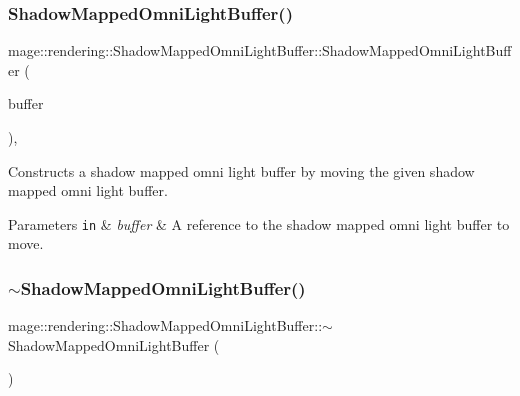 \subsubsection{\texorpdfstring{Shadow\+Mapped\+Omni\+Light\+Buffer()}{ShadowMappedOmniLightBuffer()}\hspace{0.1cm}{\footnotesize\ttfamily [3/3]}}
{\footnotesize\ttfamily mage\+::rendering\+::\+Shadow\+Mapped\+Omni\+Light\+Buffer\+::\+Shadow\+Mapped\+Omni\+Light\+Buffer (\begin{DoxyParamCaption}\item[{\mbox{\hyperlink{structmage_1_1rendering_1_1_shadow_mapped_omni_light_buffer}{Shadow\+Mapped\+Omni\+Light\+Buffer}} \&\&}]{buffer }\end{DoxyParamCaption})\hspace{0.3cm}{\ttfamily [default]}, {\ttfamily [noexcept]}}

Constructs a shadow mapped omni light buffer by moving the given shadow mapped omni light buffer.


\begin{DoxyParams}[1]{Parameters}
\mbox{\tt in}  & {\em buffer} & A reference to the shadow mapped omni light buffer to move. \\
\hline
\end{DoxyParams}
\mbox{\label{structmage_1_1rendering_1_1_shadow_mapped_omni_light_buffer_afd9afa7796bbca38082cc8364f7c474c}} 
\subsubsection{\texorpdfstring{$\sim$\+Shadow\+Mapped\+Omni\+Light\+Buffer()}{~ShadowMappedOmniLightBuffer()}}
{\footnotesize\ttfamily mage\+::rendering\+::\+Shadow\+Mapped\+Omni\+Light\+Buffer\+::$\sim$\+Shadow\+Mapped\+Omni\+Light\+Buffer (\begin{DoxyParamCaption}{ }\end{DoxyParamCaption})\hspace{0.3cm}{\ttfamily [default]}}

